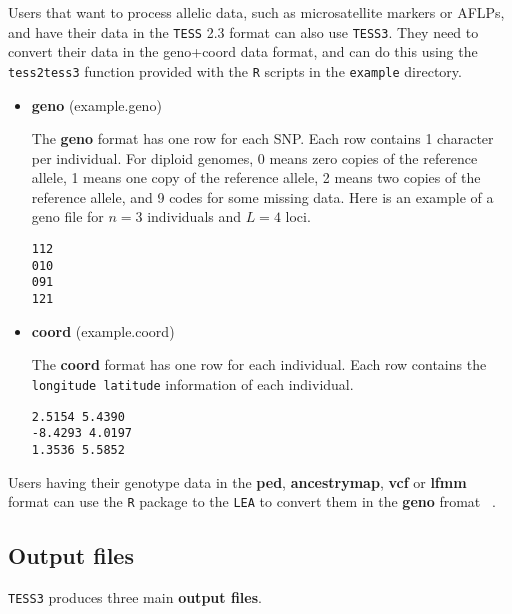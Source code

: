 \documentclass[10pt,a4paper]{article}
\begin{document}
Users that want to process allelic data, such as microsatellite markers or AFLPs, and have their data in the {\tt TESS} 2.3 format can also use {\tt TESS3}. They need to convert their data in the geno+coord data format, and can do this using the {\tt tess2tess3} function provided with the {\tt R} scripts in the {\tt example} directory.   




\begin{itemize}
\item {\bf geno} (example.geno)

The {\bf geno} format has one row for each SNP. Each row contains 1 character per individual. For diploid genomes,  0 means zero copies of the reference allele, 1 means one copy of the reference allele, 2 means two copies of the reference allele, and 9 codes for some missing data. Here is an example of a geno file for $n=3$ individuals and $L=4$ loci.
\begin{center}
\footnotesize
\begin{Verbatim}[frame=single]
112
010
091
121
\end{Verbatim}
\end{center}


\item {\bf coord} (example.coord)

The {\bf coord} format has one row for each individual. Each row contains the \verb|longitude latitude| information of each individual.

\begin{center}
\footnotesize
\begin{Verbatim}[frame=single]
2.5154 5.4390
-8.4293 4.0197
1.3536 5.5852
\end{Verbatim}
\end{center}

\end{itemize}

\noindent Users having their genotype data in the {\bf ped}, {\bf ancestrymap}, {\bf vcf} or {\bf lfmm} format  can use the {\tt R} package to the {\tt LEA} to convert them in the {\bf geno} fromat ~\cite{frichot2015lea}. 

\subsection{Output files}

{\tt TESS3} produces three main {\bf output files}.
\end{document}
